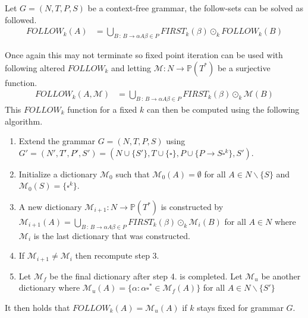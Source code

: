\begin{algorithm}
    \label{algorithm:follow}
    Let $G = (N, T, P, S)$ be a context-free grammar, the follow-sets can be solved as followed.
    \begin{align*}
        FOLLOW_k(A) &= \bigcup_{B \, : \, B \to \alpha A \beta \in P} FIRST_k(\beta) \odot_k FOLLOW_k(B)
    \end{align*}
\end{algorithm}
\noindent Once again this may not terminate so fixed point iteration can be used with following altered $FOLLOW_k$ and letting $\mathcal{M}: N \to \mathbb{P}(T^*)$ be a surjective function.
\begin{align*}
    FOLLOW_k(A, \mathcal{M}) &= \bigcup_{B \,: \, B \to \alpha A \beta \in P} FIRST_k(\beta) \odot_k \mathcal{M}(B)
\end{align*}
This $FOLLOW_k$ function for a fixed $k$ can then be computed using the following algorithm.
\begin{enumerate}
    \item Extend the grammar $G = (N, T, P, S)$ using $G' = (N', T', P', S') = (N \cup \{S'\}, T \cup \{\square\}, P \cup \{P \to S \square^k\}, S')$.
    \item Initialize a dictionary $\mathcal{M}_0$ such that $\mathcal{M}_0(A) = \emptyset$ for all $A \in N \backslash \{S\}$ and $\mathcal{M}_0(S) = \{\square^k\}$.
    \item A new dictionary $\mathcal{M}_{i+1}: N \to \mathbb{P}(T^*)$ is constructed by $\mathcal{M}_{i+1}(A) = \bigcup_{B \,: \, B \to  \alpha A \beta \in P} FIRST_k(\beta) \odot_k \mathcal{M}_{i}(B)$ for all $A \in N$ where $\mathcal{M}_{i}$ is the last dictionary that was constructed.
    \item If $\mathcal{M}_{i+1} \neq \mathcal{M}_{i}$ then recompute step 3.
    \item Let $\mathcal{M}_f$ be the final dictionary after step 4. is completed. Let $\mathcal{M}_u$ be another dictionary where $\mathcal{M}_u(A) = \{\alpha : \alpha \square^* \in \mathcal{M}_f(A)\}$ for all $A \in N \backslash \{S'\}$ 
\end{enumerate}
It then holds that $FOLLOW_k(A) = \mathcal{M}_u(A)$ if $k$ stays fixed for grammar $G$.